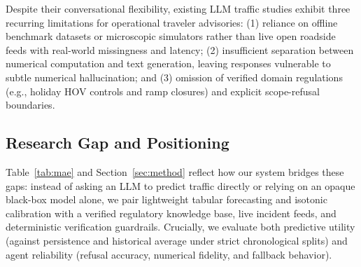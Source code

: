 Despite their conversational flexibility, existing LLM traffic studies exhibit three recurring limitations for operational traveler advisories: (1) reliance on offline benchmark datasets or microscopic simulators rather than live open roadside feeds with real-world missingness and latency; (2) insufficient separation between numerical computation and text generation, leaving responses vulnerable to subtle numerical hallucination; and (3) omission of verified domain regulations (e.g., holiday HOV controls and ramp closures) and explicit scope-refusal boundaries.

\subsection{Research Gap and Positioning}
Table~\ref{tab:mae} and Section~\ref{sec:method} reflect how our system bridges these gaps: instead of asking an LLM to predict traffic directly or relying on an opaque black-box model alone, we pair lightweight tabular forecasting and isotonic calibration with a verified regulatory knowledge base, live incident feeds, and deterministic verification guardrails. Crucially, we evaluate both predictive utility (against persistence and historical average under strict chronological splits) and agent reliability (refusal accuracy, numerical fidelity, and fallback behavior).
